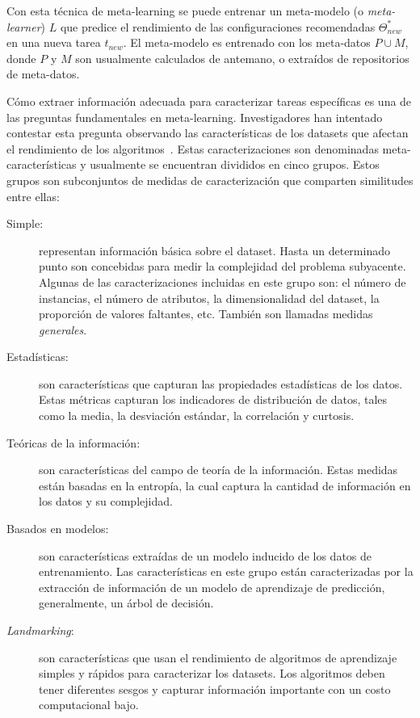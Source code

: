 \documentclass[a4paper,10pt,twocolumn]{article}
\begin{document}
Con esta técnica de meta-learning se puede entrenar un meta-modelo (o \textit{meta-learner}) $L$ que predice el rendimiento de las configuraciones recomendadas $\Theta^*_{new}$ en una nueva tarea $t_{new}$. El meta-modelo es entrenado con los meta-datos $P\cup M$, donde $P$ y $M$ son usualmente calculados de antemano, o extraídos de repositorios de meta-datos.

Cómo extraer información adecuada para caracterizar tareas específicas es una de las preguntas fundamentales en meta-learning. Investigadores han intentado contestar esta pregunta observando las características de los datasets que afectan el rendimiento de los algoritmos~\cite{Rivolli2018TowardsRE}. Estas caracterizaciones son denominadas meta-características y usualmente se encuentran divididos en cinco grupos. Estos grupos son subconjuntos de medidas de caracterización \cite{bradzil2009metalearning} que comparten similitudes entre ellas:

\begin{description}
	\item[Simple:] representan información básica sobre el dataset. Hasta un determinado punto son concebidas para medir la complejidad del problema subyacente. Algunas de las caracterizaciones incluidas en este grupo son: el número de instancias, el número de atributos, la dimensionalidad del dataset, la proporción de valores faltantes, etc. También son llamadas medidas \textit{generales}.
	
	\item[Estadísticas:] son características que capturan las propiedades estadísticas de los datos. Estas métricas capturan los indicadores de distribución de datos, tales como la media, la desviación estándar, la correlación y curtosis.
	
	\item[Teóricas de la información:] son características del campo de teoría de la información. Estas medidas están basadas en la entropía, la cual captura la cantidad de información en los datos y su complejidad.
	
	\item[Basados en modelos:] son características extraídas de un modelo inducido de los datos de entrenamiento. Las características en este grupo están caracterizadas por la extracción de información de un modelo de aprendizaje de predicción, generalmente, un árbol de decisión.
	
	\item[\textit{Landmarking}:] son características que usan el rendimiento de algoritmos de aprendizaje simples y rápidos para caracterizar los datasets. Los algoritmos deben tener diferentes sesgos y capturar información importante con un costo computacional bajo.
\end{description}
\end{document}
